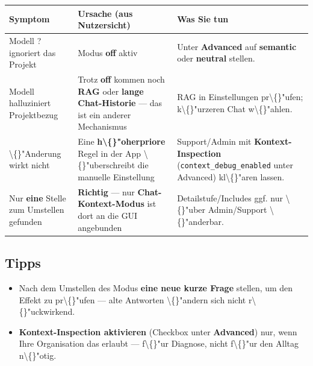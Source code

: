 \begin{center}
\begin{tabular}{lll}
\hline
Symptom & Ursache (aus Nutzersicht) & Was Sie tun \\
\hline
Modell ?ignoriert\texttt{} das Projekt & Modus \textbf{off} aktiv & Unter \textbf{Advanced} auf \textbf{semantic} oder \textbf{neutral} stellen. \\
Modell halluziniert Projektbezug & Trotz \textbf{off} kommen noch \textbf{RAG} oder \textbf{lange Chat-Historie} --- das ist ein anderer Mechanismus & RAG in Einstellungen pr\textbackslash\{\}"ufen; k\textbackslash\{\}"urzeren Chat w\textbackslash\{\}"ahlen. \\
\textbackslash\{\}"Anderung wirkt nicht & Eine \textbf{h\textbackslash\{\}"oherpriore} Regel in der App \textbackslash\{\}"uberschreibt die manuelle Einstellung & Support/Admin mit \textbf{Kontext-Inspection} (\texttt{context\_debug\_enabled} unter Advanced) kl\textbackslash\{\}"aren lassen. \\
Nur \textbf{eine} Stelle zum Umstellen gefunden & \textbf{Richtig} --- nur \textbf{Chat-Kontext-Modus} ist dort an die GUI angebunden & Detailstufe/Includes ggf. nur \textbackslash\{\}"uber Admin/Support \textbackslash\{\}"anderbar. \\
\hline
\end{tabular}
\end{center}

\subsection{Tipps}

\begin{itemize}
\item Nach dem Umstellen des Modus \textbf{eine neue kurze Frage} stellen, um den Effekt zu pr\textbackslash\{\}"ufen --- alte Antworten \textbackslash\{\}"andern sich nicht r\textbackslash\{\}"uckwirkend.
\item \textbf{Kontext-Inspection aktivieren} (Checkbox unter \textbf{Advanced}) nur, wenn Ihre Organisation das erlaubt --- f\textbackslash\{\}"ur Diagnose, nicht f\textbackslash\{\}"ur den Alltag n\textbackslash\{\}"otig.
\end{itemize}
